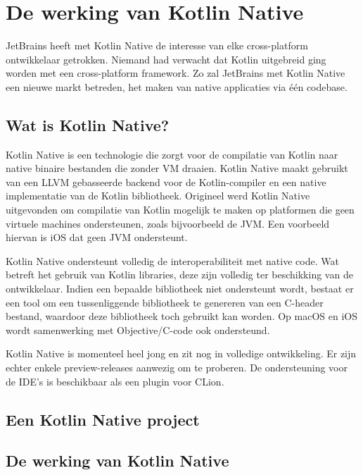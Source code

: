 
\chapter{De werking van Kotlin Native}
JetBrains heeft met Kotlin Native de interesse van elke cross-platform ontwikkelaar getrokken. Niemand had verwacht dat Kotlin uitgebreid ging worden met een cross-platform framework. Zo zal JetBrains met Kotlin Native een nieuwe markt betreden, het maken van native applicaties via één codebase.
\label{ch:kotlinnative}

\section{Wat is Kotlin Native?}
Kotlin Native is een technologie die zorgt voor de compilatie van Kotlin naar native binaire bestanden die zonder VM draaien. Kotlin Native maakt gebruikt van een LLVM gebasseerde backend voor de Kotlin-compiler en een native implementatie van de Kotlin bibliotheek. Origineel werd Kotlin Native uitgevonden om compilatie van Kotlin mogelijk te maken op platformen die geen virtuele machines ondersteunen, zoals bijvoorbeeld de JVM. Een voorbeeld hiervan is iOS dat geen JVM ondersteunt.

Kotlin Native ondersteunt volledig de interoperabiliteit met native code. Wat betreft het gebruik van Kotlin libraries, deze zijn volledig ter beschikking van de ontwikkelaar. Indien een bepaalde bibliotheek niet ondersteunt wordt, bestaat er een tool om een tussenliggende bibliotheek te genereren van een C-header bestand, waardoor deze bibliotheek toch gebruikt kan worden.  Op macOS en iOS wordt samenwerking met Objective/C-code ook ondersteund.

Kotlin Native is momenteel heel jong en zit nog in volledige ontwikkeling. Er zijn echter enkele preview-releases aanwezig om te proberen. De ondersteuning voor de IDE's is beschikbaar als een plugin voor CLion.

\section{Een Kotlin Native project}
\section{De werking van Kotlin Native}
